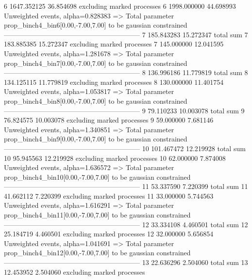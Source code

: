 6          1647.352125     36.854698       excluding marked processes    
6          1998.000000     44.698993       Unweighted events, alpha=0.828383
  => Total parameter prop_binch4_bin6[0.00,-7.00,7.00] to be gaussian constrained
------------------------------------------------------------
7          185.843283      15.272347       total sum                     
7          183.885385      15.272347       excluding marked processes    
7          145.000000      12.041595       Unweighted events, alpha=1.281678
  => Total parameter prop_binch4_bin7[0.00,-7.00,7.00] to be gaussian constrained
------------------------------------------------------------
8          136.996186      11.779819       total sum                     
8          134.125115      11.779819       excluding marked processes    
8          130.000000      11.401754       Unweighted events, alpha=1.053817
  => Total parameter prop_binch4_bin8[0.00,-7.00,7.00] to be gaussian constrained
------------------------------------------------------------
9          79.110233       10.003078       total sum                     
9          76.824575       10.003078       excluding marked processes    
9          59.000000       7.681146        Unweighted events, alpha=1.340851
  => Total parameter prop_binch4_bin9[0.00,-7.00,7.00] to be gaussian constrained
------------------------------------------------------------
10         101.467472      12.219928       total sum                     
10         95.945563       12.219928       excluding marked processes    
10         62.000000       7.874008        Unweighted events, alpha=1.636572
  => Total parameter prop_binch4_bin10[0.00,-7.00,7.00] to be gaussian constrained
------------------------------------------------------------
11         53.337590       7.220399        total sum                     
11         41.662112       7.220399        excluding marked processes    
11         33.000000       5.744563        Unweighted events, alpha=1.616291
  => Total parameter prop_binch4_bin11[0.00,-7.00,7.00] to be gaussian constrained
------------------------------------------------------------
12         33.334108       4.460501        total sum                     
12         25.184719       4.460501        excluding marked processes    
12         32.000000       5.656854        Unweighted events, alpha=1.041691
  => Total parameter prop_binch4_bin12[0.00,-7.00,7.00] to be gaussian constrained
------------------------------------------------------------
13         22.636296       2.504060        total sum                     
13         12.453952       2.504060        excluding marked processes    
